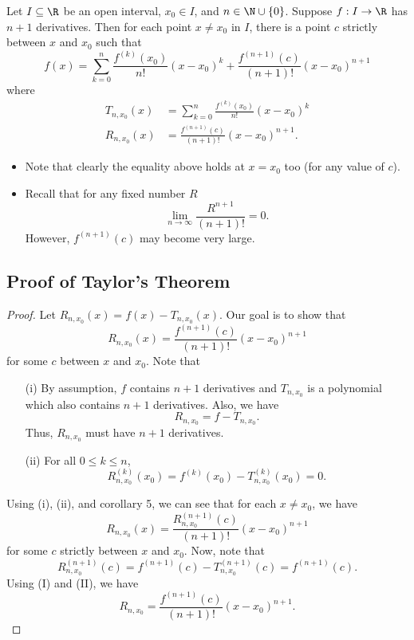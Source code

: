\begin{theorem}
    Let \( I \subseteq  \R   \) be an open interval, \( {x}_{0} \in I  \), and \( n \in \N \cup \{ 0  \}  \). Suppose \( f: I \to \R  \) has \( n + 1  \) derivatives. Then for each point \( x \neq {x}_{0} \) in \( I  \), there is a point \( c  \) strictly between \( x  \) and \( {x}_{0} \) such that 
    \[  f(x) = \sum_{ k=0  }^{  n } \frac{ f^{(k)}({x}_{0})  }{ n!  } (x - {x}_{0})^{k} + \frac{ f^{(n+1)}(c) }{  (n+1)! } (x - {x}_{0})^{n+1} \]
    where 
    \begin{align*}
        {T}_{n,{x}_{0}}(x) &= \sum_{ k=0  }^{ n } \frac{ f^{(k)}({x}_{0}) }{ n!  }  ( x - {x}_{0})^{k} \\
        {R}_{n,{x}_{0}}(x) &= \frac{ f^{(n+1)}(c) }{  (n+1)! }  (x - {x}_{0})^{n+1}.
    \end{align*}
\end{theorem}

\begin{remark}
    \begin{itemize}
        \item Note that clearly the equality above holds at \( x = {x}_{0} \) too (for any value of \( c  \)).
        \item Recall that for any fixed number \( R  \)
            \[ \lim_{ n \to \infty  }  \frac{ R^{n+1} }{ (n+1)! }  = 0.   \]
            However, \( f^{(n+1)}(c) \) may become very large.
    \end{itemize}
\end{remark}

\subsection{Proof of Taylor's Theorem}
\begin{proof}
Let \( {R}_{n,{x}_{0}}(x) = f(x) - {T}_{n,{x}_{0}}(x)  \). Our goal is to show that 
\[  {R}_{n,{x}_{0}}(x) = \frac{ f^{(n+1)}(c) }{ (n+1)! } (x - {x}_{0})^{n+1} \]
for some \( c  \) between \( x  \) and \( {x}_{0} \). Note that 
\begin{enumerate}
    \item[(i)] By assumption, \( f \) contains \( n + 1  \) derivatives and \( {T}_{n,{x}_{0}}  \) is a polynomial which also contains \( n + 1  \) derivatives. Also, we have 
        \[  {R}_{n,{x}_{0}} = f - {T}_{n,{x}_{0}}. \]
        Thus, \( {R}_{n,{x}_{0}}  \) must have \( n + 1  \) derivatives.
    \item[(ii)] For all \( 0 \leq k \leq n  \),
        \[  {R}_{n, {x}_{0}}^{(k)}({x}_{0}) = f^{(k)}({x}_{0}) - {T}_{n,{x}_{0}}^{(k)}({x}_{0}) = 0. \]
\end{enumerate}
Using (i), (ii), and corollary 5, we can see that for each \( x \neq {x}_{0} \), we have 
\[  R_{n,{x}_{0}}(x) = \frac{ {R}_{n,{x}_{0}}^{(n+1)}(c) }{ (n+1)! }  (x - {x}_{0})^{n+1} \tag{I} \]
for some \( c  \) strictly between \( x  \) and \( {x}_{0} \). Now, note that 
\[  {R}_{n,{x}_{0}}^{(n+1)}(c) = f^{(n+1)}(c) - {T}_{n,{x}_{0}}^{(n+1)}(c) = f^{(n+1)}(c). \tag{II}  \]
Using (I) and (II), we have 
\[  {R}_{n,{x}_{0}} = \frac{ f^{(n+1)}(c) }{ (n+1)! } (x - {x}_{0})^{n+1}.\]
\end{proof}

